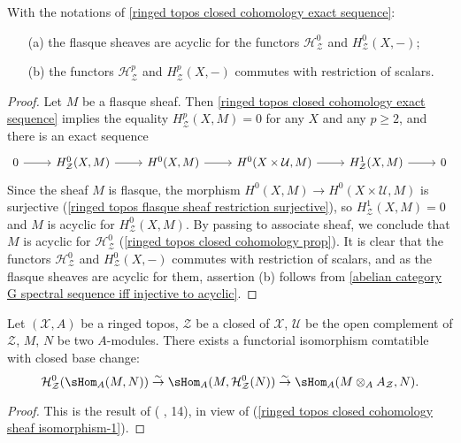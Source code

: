 \begin{proposition}\label{ringed topos closed cohomology flasque is aycyclic}
With the notations of \cref{ringed topos closed cohomology exact sequence}:
\begin{enumerate}
    \item[(a)] the flasque sheaves are acyclic for the functors $\mathcal{H}^0_\mathcal{Z}$ and $H^0_\mathcal{Z}(X,-)$;
    \item[(b)] the functors $\mathcal{H}^p_\mathcal{Z}$ and $H^p_\mathcal{Z}(X,-)$ commutes with restriction of scalars.
\end{enumerate}
\end{proposition}
\begin{proof}
Let $M$ be a flasque sheaf. Then \cref{ringed topos closed cohomology exact sequence} implies the equality $H_\mathcal{Z}^p(X,M)=0$ for any $X$ and any $p\geq 2$, and there is an exact sequence
\[\begin{tikzcd}
0 \ar[r] & H^0_\mathcal{Z}(X,M) \ar[r] & H^0(X,M) \ar[r] & H^0(X\times\mathcal{U},M) \ar[r] & H^1_\mathcal{Z}(X,M) \ar[r] & 0
\end{tikzcd}\]
Since the sheaf $M$ is flasque, the morphism $H^0(X,M)\to H^0(X\times\mathcal{U},M)$ is surjective (\cref{ringed topos flasque sheaf restriction surjective}), so $H^1_\mathcal{Z}(X,M)=0$ and $M$ is acyclic for $H^0_\mathcal{Z}(X,M)$. By passing to associate sheaf, we conclude that $M$ is acyclic for $\mathcal{H}^0_\mathcal{Z}$ (\cref{ringed topos closed cohomology prop}). It is clear that the functors $\mathcal{H}^0_\mathcal{Z}$ and $H^0_\mathcal{Z}(X,-)$ commutes with restriction of scalars, and as the flasque sheaves are acyclic for them, assertion (b) follows from \cref{abelian category G spectral sequence iff injective to acyclic}.
\end{proof}

\begin{proposition}\label{ringed topos closed cohomology of Hom isomorphism}
Let $(\mathcal{X},A)$ be a ringed topos, $\mathcal{Z}$ be a closed of $\mathcal{X}$, $\mathcal{U}$ be the open complement of $\mathcal{Z}$, $M$, $N$ be two $A$-modules. There exists a functorial isomorphism comtatible with closed base change:
\begin{equation}\label{ringed topos closed cohomology of Hom isomorphism-1}
\mathcal{H}^0_\mathcal{Z}(\sHom_A(M,N)) \stackrel{\sim}{\to } \sHom_A(M,\mathcal{H}^0_\mathcal{Z}(N)) \stackrel{\sim}{\to } \sHom_A(M\otimes_AA_\mathcal{Z},N).
\end{equation}
\end{proposition}
\begin{proof}
This is the result of (\cite{SGA4-1} , 14), in view of (\ref{ringed topos closed cohomology sheaf isomorphism-1}). 
\end{proof}

